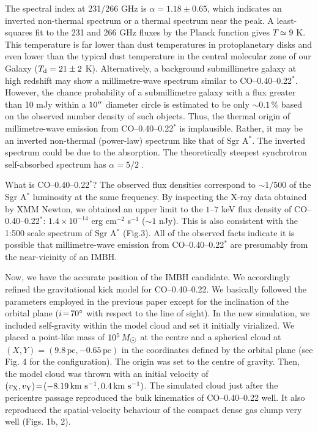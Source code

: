 \documentclass{nature}
\def\kms{\hbox{km s$^{-1}$}}
\def\sun{\hbox{$\odot$}}
\def\arcdeg{\hbox{$^\circ$}}
\def\arcsec{\hbox{$^{\prime\prime}$}}
\begin{document}
The spectral index at 231/266 GHz is $\alpha\!=\!1.18\!\pm\!0.65$, which indicates an inverted non-thermal spectrum or a thermal spectrum near the peak. A least-squares fit to the 231 and 266 GHz fluxes by the Planck function gives $T\!\simeq\!9$ K. This temperature is far lower than dust temperatures in protoplanetary disks and even lower than the typical dust temperature in the central molecular zone of our Galaxy ($T_{\rm d}=21\pm 2$ K)\cite{Pierce00}. Alternatively, a background submillimetre galaxy at high redshift may show a millimetre-wave spectrum similar to CO--0.40--0.22$^*$. However, the chance probability of a submillimetre galaxy with a flux greater than 10 mJy within a $10\arcsec$ diameter circle is estimated to be only $\sim 0.1\,\%$ based on the observed number density of such objects\cite{Hatsukade11}. Thus, the thermal origin of millimetre-wave emission from CO--0.40--0.22$^*$ is implausible. Rather, it may be an inverted non-thermal (power-law) spectrum like that of Sgr A$^*$. The inverted spectrum could be due to the absorption. The theoretically steepest synchrotron self-absorbed spectrum has $\alpha\!=\!5/2\;$\cite{Rybicki86}.  

What is CO--0.40--0.22$^*$? The observed flux densities correspond to $\sim\!1/500$ of the Sgr A$^*$ luminosity at the same frequency. By inspecting the X-ray data obtained by XMM Newton, we obtained an upper limit to the $1\mbox{--}7$ keV flux density of CO--0.40--0.22$^*$: $1.4\!\times\!10^{-14}$ erg cm$^{-2}$ s$^{-1}$ ($\sim\!1$ nJy). This is also consistent with the 1:500 scale spectrum of Sgr A$^*$ (Fig.3). All of the observed facts indicate it is possible that millimetre-wave emission from CO--0.40--0.22$^*$ are presumably from the near-vicinity of an IMBH.

Now, we have the accurate position of the IMBH candidate. We accordingly refined the gravitational kick model for CO--0.40--0.22. We basically followed the parameters employed in the previous paper\cite{Oka16} except for the inclination of the orbital plane ($i\!=\!70\arcdeg$ with respect to the line of sight). In the new simulation, we included self-gravity within the model cloud and set it initially virialized. We placed a point-like mass of $10^5\,M_{\sun}$ at the centre and a spherical cloud 
at $(X, Y)\!=\!(9.8\,\mbox{pc}, -0.65\,\mbox{pc})$ in the coordinates defined by the orbital plane (see Fig. 4 for the configuration). The origin was set to the centre of gravity. Then, the model cloud was thrown with an initial velocity of $(v_{\rm X}, v_{\rm Y})\!=\!(-8.19\,\kms , 0.4\,\kms)$. The simulated cloud just after the pericentre passage reproduced the bulk kinematics of CO--0.40--0.22 well. It also reproduced the spatial-velocity behaviour of the compact dense gas clump very well (Figs. 1b, 2).
\end{document}
